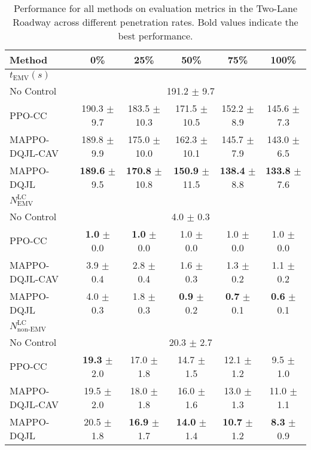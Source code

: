 \begin{table}[htbp]
\centering
{\fontsize{9}{11}\selectfont
\begin{tabular}{lccccc}
\toprule
\textbf{Method} & \textbf{0\%} & \textbf{25\%} & \textbf{50\%} & \textbf{75\%} & \textbf{100\%} \\
\midrule
\textbf{\textit{$t_{\text{EMV}} (s)$}} & & & & & \\ 
\multirow{1}{*}{No Control} & \multicolumn{5}{c}{191.2 $\pm$ 9.7} \\[6pt]
PPO-CC~\cite{suo2024model} 
& 190.3 $\pm$ 9.7 
& 183.5 $\pm$ 10.3
& 171.5 $\pm$ 10.5 
& 152.2 $\pm$ 8.9 
& 145.6 $\pm$ 7.3 \\[6pt]
MAPPO-DQJL-CAV 
& 189.8 $\pm$ 9.9 
& 175.0 $\pm$ 10.0
& 162.3 $\pm$ 10.1 
& 145.7 $\pm$ 7.9 
& 143.0 $\pm$ 6.5 \\[6pt]
MAPPO-DQJL 
& \textbf{189.6} $\pm$ 9.5 
& \textbf{170.8} $\pm$ 10.8
& \textbf{150.9} $\pm$ 11.5 
& \textbf{138.4} $\pm$ 8.8 
& \textbf{133.8} $\pm$ 7.6 \\
\midrule
\textbf{\textit{\boldmath$N_{\text{EMV}}^{\text{LC}}$}} & & & & & \\ 
\multirow{1}{*}{No Control} & \multicolumn{5}{c}{4.0 $\pm$ 0.3} \\[6pt]
PPO-CC~\cite{suo2024model} 
& \textbf{1.0} $\pm$ 0.0 & \textbf{1.0} $\pm$ 0.0 & 1.0 $\pm$ 0.0 & 1.0 $\pm$ 0.0 & 1.0 $\pm$ 0.0 \\[6pt]
MAPPO-DQJL-CAV 
& 3.9 $\pm$ 0.4 & 2.8 $\pm$ 0.4 & 1.6 $\pm$ 0.3 & 1.3 $\pm$ 0.2 & 1.1 $\pm$ 0.2 \\[6pt]
MAPPO-DQJL 
& 4.0 $\pm$ 0.3 & 1.8 $\pm$ 0.3 & \textbf{0.9} $\pm$ 0.2 & \textbf{0.7} $\pm$ 0.1 & \textbf{0.6} $\pm$ 0.1 \\
\midrule
\textbf{\textit{\boldmath$N_{\text{non-EMV}}^{\text{LC}}$}} & & & & & \\ 
\multirow{1}{*}{No Control} & \multicolumn{5}{c}{20.3 $\pm$ 2.7} \\[6pt]
PPO-CC~\cite{suo2024model} 
& \textbf{19.3} $\pm$ 2.0 & 17.0 $\pm$ 1.8 & 14.7 $\pm$ 1.5 & 12.1 $\pm$ 1.2 & 9.5 $\pm$ 1.0 \\[6pt]
MAPPO-DQJL-CAV 
& 19.5 $\pm$ 2.0 & 18.0 $\pm$ 1.8 & 16.0 $\pm$ 1.6 & 13.0 $\pm$ 1.3 & 11.0 $\pm$ 1.1 \\[6pt]
MAPPO-DQJL 
& 20.5 $\pm$ 1.8 & \textbf{16.9} $\pm$ 1.7 & \textbf{14.0} $\pm$ 1.4 & \textbf{10.7} $\pm$ 1.2 & \textbf{8.3} $\pm$ 0.9 \\
\bottomrule
\end{tabular}
}
\caption{Performance for all methods on evaluation metrics in the Two-Lane Roadway across different penetration rates. Bold values indicate the best performance.}
\label{tab:penetration_study_two_lane}
\end{table}
